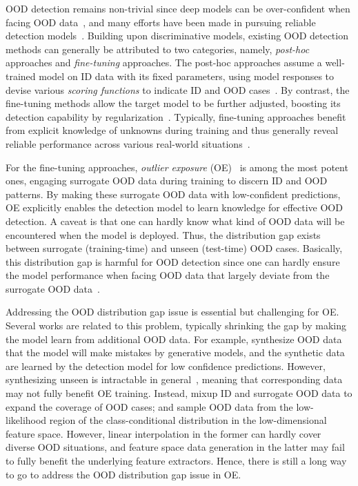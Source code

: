 \documentclass{article} \usepackage{iclr2022_conference,times}
\begin{document}
OOD detection remains non-trivial since deep models can be over-confident when facing OOD data~\citep{nguyen2015deep,BendaleB16}, and many efforts have been made in pursuing reliable {detection models}~\citep{yang2021generalized,salehi2021unified}. Building upon discriminative models, existing OOD detection methods can generally be attributed to two categories, namely, \emph{post-hoc} approaches and \emph{fine-tuning} approaches. The post-hoc approaches assume a well-trained model on ID data with its fixed parameters, using model responses to devise various \emph{scoring functions} to indicate ID and OOD cases~\citep{hendrycks2016baseline,LiangLS18,lee2018simple,liu2020energy,sun2021react,SunM0L22,wang2022watermarking}. By contrast, the fine-tuning methods allow the target model to be further adjusted, boosting its detection capability by regularization~\citep{LeeLLS18,HendrycksMD19,Tack20CSI,MohseniPYW20,SehwagCM21,ChenLWLJ21,du2022vos,MingFL22,BitterwolfMA022}. Typically, fine-tuning approaches benefit from explicit knowledge of unknowns during training and thus generally reveal reliable performance across various real-world situations~\citep{yang2021generalized}. 

For the fine-tuning approaches, \emph{outlier exposure} (OE)~\citep{HendrycksMD19} is among the most potent ones, engaging surrogate OOD data during training to discern ID and OOD patterns. By making these surrogate OOD data with low-confident predictions, OE explicitly enables the detection model to learn knowledge for effective OOD detection. A caveat is that one can hardly know what kind of OOD data will be encountered when the model is deployed. Thus, the distribution gap exists between surrogate (training-time) and unseen (test-time) OOD cases. Basically, this distribution gap is harmful for OOD detection since one can hardly ensure the model performance when facing OOD data that largely deviate from the surrogate OOD data~\citep{yang2021generalized,What_Transferred_Dong_CVPR2020}. 



Addressing the OOD distribution gap issue is essential but challenging for OE. Several works are related to this problem, typically shrinking the  gap by making the model learn from additional OOD data. For example, \cite{LeeLLS18} synthesize OOD data that the model will make mistakes by generative models, and the synthetic data are learned by the detection model for low confidence predictions. However, synthesizing unseen is intractable in general~\citep{du2022vos}, meaning that corresponding data may not fully benefit OE training. Instead, \cite{zhang2021mixture} mixup ID and surrogate OOD data to expand the coverage of OOD cases; and \cite{du2022vos} sample OOD data from the low-likelihood region of the class-conditional distribution in the low-dimensional feature space. However, linear interpolation in the former can hardly cover diverse OOD situations, and feature space data generation in the latter may fail to fully benefit the underlying feature extractors. Hence, there is still a long way to go to address the OOD distribution gap issue in OE.
\end{document}
